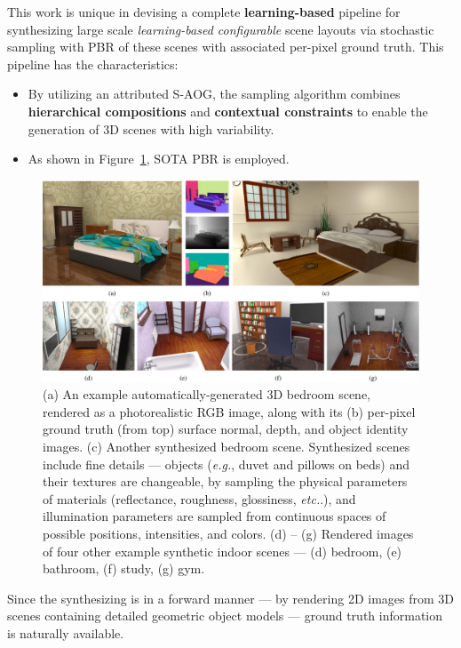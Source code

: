 \documentclass[10pt]{article}
\newcommand{\Fig}[1]{Figure~\ref{fig:#1}}
\newcommand{\Eg}{\textit{e.g.}}
\newcommand{\Etc}{\textit{etc.}}
\begin{document}
This work is unique in devising a complete \textbf{learning-based} pipeline for
synthesizing large scale \textit{learning-based configurable} scene layouts via
stochastic sampling with PBR of these scenes with associated per-pixel ground
truth. This pipeline has the characteristics:
%
\begin{itemize}
  \item By utilizing an attributed S-AOG, the sampling algorithm combines
    \textbf{hierarchical compositions} and \textbf{contextual constraints} to
    enable the generation of 3D scenes with high variability.
  \item As shown in \Fig{1}, SOTA PBR is employed.
\end{itemize}
%
\begin{figure}[!htpb]
  \centering
  \includegraphics[width=0.9\linewidth]{fig_1.png}
  \caption{(a) An example automatically-generated 3D bedroom scene, rendered as
    a photorealistic RGB image, along with its (b) per-pixel ground truth (from
    top) surface normal, depth, and object identity images. (c) Another
    synthesized bedroom scene. Synthesized scenes include fine details ---
    objects (\Eg, duvet and pillows on beds) and their textures are changeable,
    by sampling the physical parameters of materials (reflectance, roughness,
    glossiness, \Etc.), and illumination parameters are sampled from continuous
    spaces of possible positions, intensities, and colors. (d) – (g) Rendered
    images of four other example synthetic indoor scenes --- (d) bedroom, (e)
    bathroom, (f) study, (g) gym.}%
  \label{fig:1}
\end{figure}

Since the synthesizing is in a forward manner --- by rendering 2D images from
3D scenes containing detailed geometric object models --- ground truth
information is naturally available.
\end{document}
